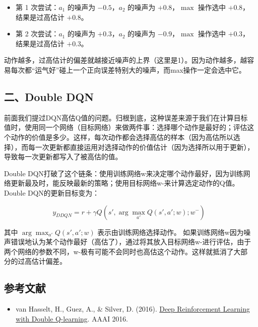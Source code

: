 \begin{itemize}
\tightlist
\item
  第 1 次尝试：\(a_1\) 的噪声为 \(-0.5\)，\(a_2\) 的噪声为 \(+0.8\)，\(\max\) 操作选中 \(+0.8\)，结果是过高估计 \(+0.8\)。
\item
  第 2 次尝试：\(a_1\) 的噪声为 \(+0.3\)，\(a_2\) 的噪声为 \(-0.9\)，\(\max\) 操作选中 \(+0.3\)，结果是过高估计 \(+0.3\)。
\end{itemize}

动作越多，过高估计的偏差就越接近噪声的上界（这里是1）。因为动作越多，越容易每次都``运气好''碰上一个正向误差特别大的噪声，而max操作一定会选中它。

\hypertarget{ux4e8cdouble-dqn}{%
\subsection{二、Double DQN}\label{ux4e8cdouble-dqn}}

前面我们提过DQN高估Q值的问题。归根到底，这种误差来源于我们在计算目标值时，使用同一个网络（目标网络）来做两件事：选择哪个动作是最好的；评估这个动作的价值是多少。这样，每次动作都会选择高估的样本（因为高估所以选择），而每一次更新都直接运用对选择动作的价值估计（因为选择所以用于更新），导致每一次更新都写入了被高估的值。

Double DQN打破了这个链条：使用训练网络w来决定哪个动作最好，因为训练网络更新最及时，能反映最新的策略；使用目标网络w-来计算选定动作的Q值。Double DQN的更新目标变为：

\[
y_{DDQN}=r+\gamma Q(s',\arg\max_{a'}Q(s',a';w);w^{-})
\]

其中 \(\arg\max_{a'}Q(s',a';w)\) 表示由训练网络选择动作。
如果训练网络w因为噪声错误地认为某个动作最好（高估了），通过将其放入目标网络w-进行评估，由于两个网络的参数不同，w-极有可能不会同时也高估这个动作。这样就抵消了大部分的过高估计偏差。

\FloatBarrier
{}
\hypertarget{ux53c2ux8003ux6587ux732e-51}{%
\subsection{参考文献}\label{ux53c2ux8003ux6587ux732e-51}}

\vspace{0.25em}
\begin{itemize}
\tightlist
\item
  van Hasselt, H., Guez, A., \& Silver, D. (2016). \href{https://arxiv.org/abs/1509.06461}{Deep Reinforcement Learning with Double Q-learning}. AAAI 2016.
\end{itemize}

\clearpage
